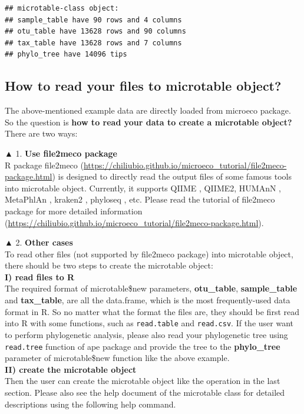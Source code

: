 \documentclass[
]{book}
\begin{document}
\begin{verbatim}
## microtable-class object:
## sample_table have 90 rows and 4 columns
## otu_table have 13628 rows and 90 columns
## tax_table have 13628 rows and 7 columns
## phylo_tree have 14096 tips
\end{verbatim}

\hypertarget{how-to-read-your-files-to-microtable-object}{%
\subsection{How to read your files to microtable object?}\label{how-to-read-your-files-to-microtable-object}}

The above-mentioned example data are directly loaded from microeco package.
So the question is \textbf{how to read your data to create a microtable object?}\\
There are two ways:

▲ 1. \textbf{Use file2meco package}\\
R package file2meco (\url{https://chiliubio.github.io/microeco_tutorial/file2meco-package.html}) is designed to directly read the output files of some famous tools into microtable object.
Currently, it supports QIIME \citep{Caporaso_QIIME_2010}, QIIME2\citep{Bolyen_Reproducible_2019},
HUMAnN \citep{Franzosa_Species_2018}, MetaPhlAn \citep{Truong_MeTApHLaN2_2015}, kraken2 \citep{Wood_Improved_2019}, phyloseq \citep{Mcmurdie_phyloseq_2013}, etc.
Please read the tutorial of file2meco package for more detailed information (\url{https://chiliubio.github.io/microeco_tutorial/file2meco-package.html}).

▲ 2. \textbf{Other cases}\\
To read other files (not supported by file2meco package) into microtable object,
there should be two steps to create the microtable object:\\
\textbf{I) read files to R}\\
The required format of microtable\$new parameters, \textbf{otu\_table}, \textbf{sample\_table} and \textbf{tax\_table}, are all the data.frame, which is the most frequently-used data format in R.
So no matter what the format the files are, they should be first read into R with some functions, such as \texttt{read.table} and \texttt{read.csv}.
If the user want to perform phylogenetic analysis, please also read your phylogenetic tree using \texttt{read.tree} function of ape package and
provide the tree to the \textbf{phylo\_tree} parameter of microtable\$new function like the above example.\\
\textbf{II) create the microtable object}\\
Then the user can create the microtable object like the operation in the last section.
Please also see the help document of the microtable class for detailed descriptions using the following help command.
\end{document}
